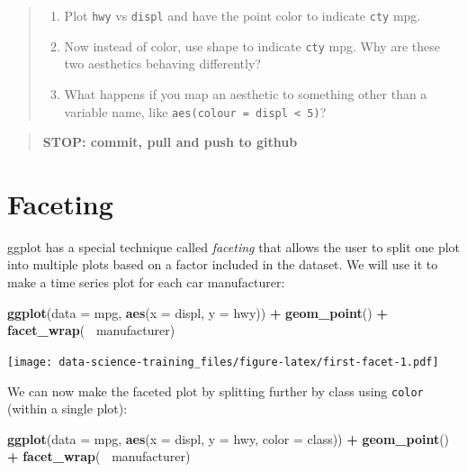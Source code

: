 \documentclass[]{book}
\newenvironment{Shaded}{\begin{snugshade}}{\end{snugshade}}
\newcommand{\KeywordTok}[1]{\textcolor[rgb]{0.13,0.29,0.53}{\textbf{#1}}}
\newcommand{\DataTypeTok}[1]{\textcolor[rgb]{0.13,0.29,0.53}{#1}}
\newcommand{\StringTok}[1]{\textcolor[rgb]{0.31,0.60,0.02}{#1}}
\newcommand{\OperatorTok}[1]{\textcolor[rgb]{0.81,0.36,0.00}{\textbf{#1}}}
\newcommand{\NormalTok}[1]{#1}
\providecommand{\tightlist}{%
  \setlength{\itemsep}{0pt}\setlength{\parskip}{0pt}}
\theoremstyle{definition}
\theoremstyle{definition}
\theoremstyle{definition}
\theoremstyle{remark}
\begin{document}
\begin{quote}
\begin{enumerate}
\def\labelenumi{\arabic{enumi}.}
\setcounter{enumi}{1}
\tightlist
\item
  Plot \texttt{hwy} vs \texttt{displ} and have the point color to
  indicate \texttt{cty} mpg.
\item
  Now instead of color, use shape to indicate \texttt{cty} mpg. Why are
  these two aesthetics behaving differently?
\item
  What happens if you map an aesthetic to something other than a
  variable name, like \texttt{aes(colour\ =\ displ\ \textless{}\ 5)}?
\end{enumerate}
\end{quote}

\begin{quote}
\textbf{STOP: commit, pull and push to github}
\end{quote}

\section{Faceting}\label{faceting}

ggplot has a special technique called \emph{faceting} that allows the
user to split one plot into multiple plots based on a factor included in
the dataset. We will use it to make a time series plot for each car
manufacturer:

\begin{Shaded}
\begin{Highlighting}[]
\KeywordTok{ggplot}\NormalTok{(}\DataTypeTok{data =}\NormalTok{ mpg, }\KeywordTok{aes}\NormalTok{(}\DataTypeTok{x =}\NormalTok{ displ, }\DataTypeTok{y =}\NormalTok{ hwy)) }\OperatorTok{+}
\StringTok{    }\KeywordTok{geom_point}\NormalTok{() }\OperatorTok{+}
\StringTok{    }\KeywordTok{facet_wrap}\NormalTok{(}\OperatorTok{~}\StringTok{ }\NormalTok{manufacturer)}
\end{Highlighting}
\end{Shaded}

\texttt{[image: data-science-training\_files/figure-latex/first-facet-1.pdf]}

We can now make the faceted plot by splitting further by class using
\texttt{color} (within a single plot):

\begin{Shaded}
\begin{Highlighting}[]
 \KeywordTok{ggplot}\NormalTok{(}\DataTypeTok{data =}\NormalTok{ mpg, }\KeywordTok{aes}\NormalTok{(}\DataTypeTok{x =}\NormalTok{ displ, }\DataTypeTok{y =}\NormalTok{ hwy, }\DataTypeTok{color =}\NormalTok{ class)) }\OperatorTok{+}
\StringTok{     }\KeywordTok{geom_point}\NormalTok{() }\OperatorTok{+}
\StringTok{     }\KeywordTok{facet_wrap}\NormalTok{(}\OperatorTok{~}\StringTok{ }\NormalTok{manufacturer)}
\end{Highlighting}
\end{Shaded}
\end{document}
